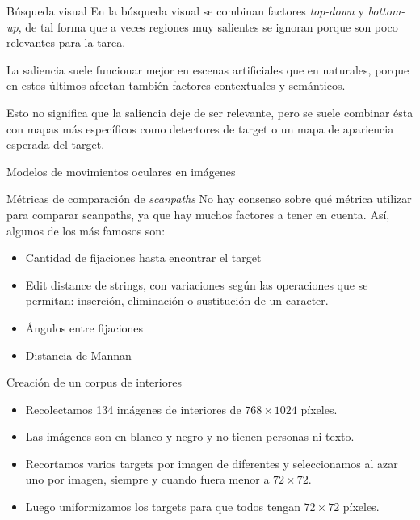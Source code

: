 \documentclass[compress]{beamer}
\begin{document}
\begin{frame}{Búsqueda visual}
En la búsqueda visual se combinan factores \textit{top-down} y \textit{bottom-up}, de tal forma que a veces regiones muy salientes se ignoran porque son poco relevantes para la tarea.

\bigskip
La saliencia suele funcionar mejor en escenas artificiales que en naturales, porque en estos últimos afectan también factores contextuales y semánticos.

\bigskip

Esto no significa que la saliencia deje de ser relevante, pero se suele combinar ésta con mapas más específicos como detectores de target o un mapa de apariencia esperada del target.

\end{frame}

\begin{frame}{Modelos de movimientos oculares en imágenes}
\end{frame}

\begin{frame}{Métricas de comparación de \textit{scanpaths}}
No hay consenso sobre qué métrica utilizar para comparar scanpaths, ya que hay muchos factores a tener en cuenta. Así, algunos de los más famosos son:
\begin{itemize}
\item Cantidad de fijaciones hasta encontrar el target
\item Edit distance de strings, con variaciones según las operaciones que se permitan: inserción, eliminación o sustitución de un caracter.
\item Ángulos entre fijaciones
\item Distancia de Mannan
\end{itemize}
\end{frame}

\begin{frame}{Creación de un corpus de interiores}
\begin{itemize}
\item Recolectamos 134 imágenes de interiores de $768 \times 1024$ píxeles.
\item Las imágenes son en blanco y negro y no tienen personas ni texto.
\item Recortamos varios targets por imagen de diferentes y seleccionamos al azar uno por imagen, siempre y cuando fuera menor a $72 \times 72$.
\item Luego uniformizamos los targets para que todos tengan $72 \times 72$ píxeles.
\end{itemize}
\end{frame}
\end{document}
